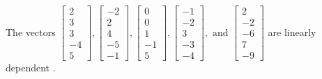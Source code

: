 \begin{exercise}
\begin{exerciseStatement}
  \end{exerciseStatement}
  \begin{exerciseAnswer}
   The vectors \(\left[\begin{array}{r}
2 \\
3 \\
3 \\
-4 \\
5
\end{array}\right] , \left[\begin{array}{r}
-2 \\
2 \\
4 \\
-5 \\
-1
\end{array}\right] , \left[\begin{array}{r}
0 \\
0 \\
1 \\
-1 \\
5
\end{array}\right] , \left[\begin{array}{r}
-1 \\
-2 \\
3 \\
-3 \\
-4
\end{array}\right] , \text{ and } \left[\begin{array}{r}
2 \\
-2 \\
-6 \\
7 \\
-9
\end{array}\right]\) are 
  	 linearly dependent  .
  


  \end{exerciseAnswer}
\end{exercise}